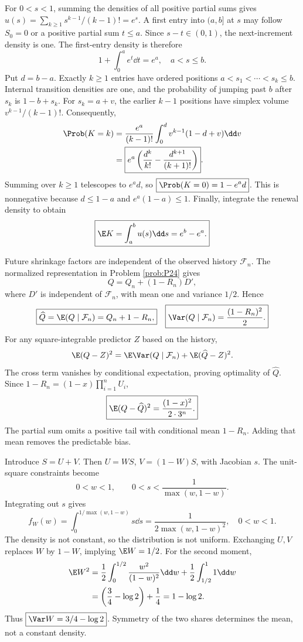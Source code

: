 For $0<s<1$, summing the densities of all positive partial sums gives $u(s)=\sum_{k\ge1}s^{k-1}/(k-1)!=e^s$. A first entry into $(a,b]$ at $s$ may follow $S_0=0$ or a positive partial sum $t\le a$. Since $s-t\in(0,1)$, the next-increment density is one. The first-entry density is therefore
\[
1+\int_0^a e^t\dd t=e^a,\quad a<s\le b.
\]
Put $d=b-a$. Exactly $k\ge1$ entries have ordered positions $a<s_1<\cdots<s_k\le b$. Internal transition densities are one, and the probability of jumping past $b$ after $s_k$ is $1-b+s_k$. For $s_k=a+v$, the earlier $k-1$ positions have simplex volume $v^{k-1}/(k-1)!$. Consequently,
\[
\begin{aligned}
\Prob(K=k)
&=\frac{e^a}{(k-1)!}\int_0^d v^{k-1}(1-d+v)\dd v\\
&=\boxed{e^a\left(\frac{d^k}{k!}-\frac{d^{k+1}}{(k+1)!}\right)}.
\end{aligned}
\]
Summing over $k\ge1$ telescopes to $e^ad$, so $\boxed{\Prob(K=0)=1-e^ad}$. This is nonnegative because $d\le1-a$ and $e^a(1-a)\le1$. Finally, integrate the renewal density to obtain
\[
\boxed{\E K=\int_a^bu(s)\dd s=e^b-e^a.}
\]

Future shrinkage factors are independent of the observed history $\mathcal F_n$. The normalized representation in Problem \ref{prob:P24} gives
\[
Q=Q_n+(1-R_n)D',
\]
where $D'$ is independent of $\mathcal F_n$, with mean one and variance $1/2$. Hence
\[
\boxed{\widehat Q=\E(Q\mid\mathcal F_n)=Q_n+1-R_n,}
\quad
\boxed{\Var(Q\mid\mathcal F_n)=\frac{(1-R_n)^2}{2}.}
\]
For any square-integrable predictor $Z$ based on the history,
\[
\E(Q-Z)^2=\E\Var(Q\mid\mathcal F_n)+\E(\widehat Q-Z)^2.
\]
The cross term vanishes by conditional expectation, proving optimality of $\widehat Q$. Since $1-R_n=(1-x)\prod_{i=1}^nU_i$,
\[
\boxed{\E(Q-\widehat Q)^2=\frac{(1-x)^2}{2\cdot3^n}.}
\]
The partial sum omits a positive tail with conditional mean $1-R_n$. Adding that mean removes the predictable bias.

Introduce $S=U+V$. Then $U=WS$, $V=(1-W)S$, with Jacobian $s$. The unit-square constraints become
\[
0<w<1,\qquad 0<s<\frac1{\max(w,1-w)}.
\]
Integrating out $s$ gives
\[
\boxed{f_W(w)=\int_0^{1/\max(w,1-w)}s\dd s
=\frac1{2\max(w,1-w)^2},\quad0<w<1.}
\]
The density is not constant, so the distribution is not uniform. Exchanging $U,V$ replaces $W$ by $1-W$, implying $\E W=1/2$. For the second moment,
\[
\begin{aligned}
\E W^2&=\frac12\int_0^{1/2}\frac{w^2}{(1-w)^2}\dd w
+\frac12\int_{1/2}^1 1\dd w\\
&=\left(\frac34-\log2\right)+\frac14=1-\log2.
\end{aligned}
\]
Thus $\boxed{\Var W=3/4-\log2}$. Symmetry of the two shares determines the mean, not a constant density.

